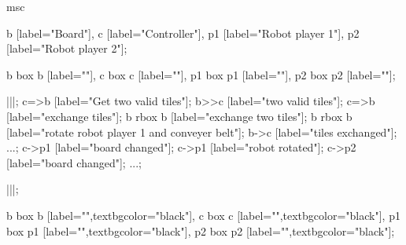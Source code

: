 \begin{msc}
msc
{

b [label="Board"],
c [label="Controller"],
p1 [label="Robot player 1"],
p2 [label="Robot player 2"];

b box b [label=""],
c box c [label=""],
p1 box p1 [label=""],
p2 box p2 [label=""];

|||;
c=>b [label="Get two valid tiles"];
b>>c [label="two valid tiles"];
c=>b [label="exchange tiles"];
b rbox b [label="exchange two tiles"];
b rbox b [label="rotate robot player 1 and conveyer belt"];
b->c [label="tiles exchanged"];
...;
c->p1 [label="board changed"];
c->p1 [label="robot rotated"];
c->p2 [label="board changed"];
...;

|||;

b box b [label="",textbgcolor="black"],
c box c [label="",textbgcolor="black"],
p1 box p1 [label="",textbgcolor="black"],
p2 box p2 [label="",textbgcolor="black"];

}
\end{msc}

